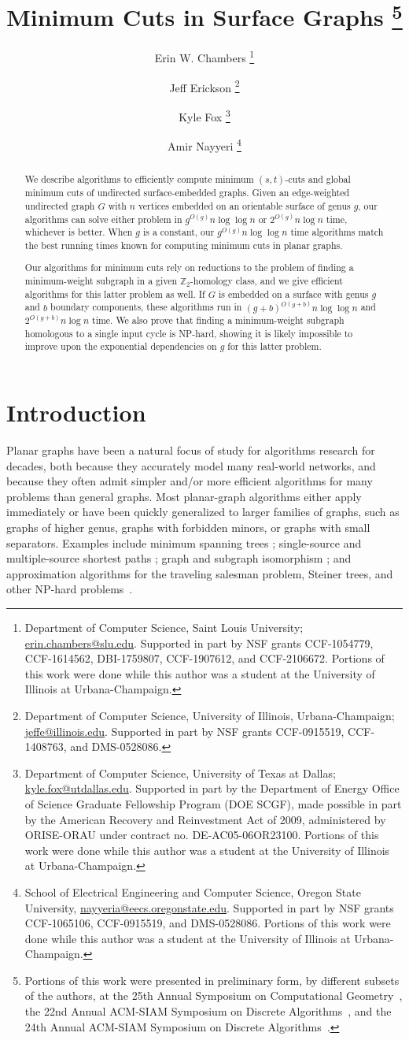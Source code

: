 \documentclass[letterpaper,review]{siamart190516}
\title{Minimum Cuts in Surface Graphs%
\thanks{
Portions of this work were presented in preliminary form, by different subsets of the authors, at
the 25th Annual Symposium on Computational Geometry~\cite{cen-mcshc-09}, the 22nd Annual ACM-SIAM
Symposium on Discrete Algorithms~\cite{en-mcsnc-11}, and the 24th Annual ACM-SIAM Symposium on Discrete Algorithms~\cite{efn-gmcse-12}.
}}
\author{
Erin W. Chambers%
	\thanks{Department of Computer Science,
	Saint Louis University;
	\url{erin.chambers@slu.edu}.
	Supported in part by NSF grants CCF-1054779, CCF-1614562, DBI-1759807, CCF-1907612, and CCF-2106672.
	Portions of this work were done while this author was a student at the University of Illinois at Urbana-Champaign.}
%
\and
Jeff Erickson%
	\thanks{Department of Computer Science,
	University of Illinois, Urbana-Champaign;
	\url{jeffe@illinois.edu}.
	Supported in part by NSF grants CCF-0915519, CCF-1408763, and DMS-0528086.
  }
%
\and
Kyle Fox%
	\thanks{Department of Computer Science,
	University of Texas at Dallas;
	\url{kyle.fox@utdallas.edu}.
	Supported in part by the Department of Energy Office of Science Graduate Fellowship Program (DOE SCGF), made possible in part by the American Recovery and Reinvestment Act of 2009, administered by ORISE-ORAU under contract no. DE-AC05-06OR23100.
	Portions of this work were done while this author was a student at the University of Illinois at Urbana-Champaign.}
%
\and
Amir Nayyeri%
	\thanks{School of Electrical Engineering and Computer Science,
	Oregon State University,
	\url{nayyeria@eecs.oregonstate.edu}.
	Supported in part by NSF grants CCF-1065106, CCF-0915519, and DMS-0528086.
	Portions of this work were done while this author was a student at the University of Illinois at Urbana-Champaign.}
}
\def\Z{\mathbb{Z}}
\begin{document}
\maketitle
\begin{abstract}
We describe algorithms to efficiently compute minimum $(s,t)$-cuts and global minimum cuts of
undirected surface-embedded graphs.
Given an edge-weighted undirected graph $G$ with $n$ vertices embedded on an orientable surface of
genus $g$, our algorithms can solve either problem in $g^{O(g)} n \log \log n$ or $2^{O(g)} n \log
n$ time, whichever is better.
When $g$ is a constant, our $g^{O(g)} n \log \log n$ time algorithms match the best running times
known for computing minimum cuts in planar graphs.

Our algorithms for minimum cuts rely on reductions to the problem of finding a minimum-weight
subgraph in a given \(\Z_2\)-homology class, and we give efficient algorithms for this latter
problem as well.
If $G$ is embedded on a surface with genus $g$ and $b$ boundary components, these algorithms run in $(g + b)^{O(g
+ b)} n \log \log n$ and $2^{O(g + b)} n \log n$ time.
We also prove that finding a minimum-weight subgraph homologous to a single input cycle is NP-hard,
showing it is likely impossible to improve upon the exponential dependencies on $g$ for this latter
problem.
\end{abstract}

\section{Introduction}
\label{sec:intro}


Planar graphs have been a natural focus of study for algorithms research for decades, both because
they accurately model many real-world networks, and because they often admit simpler and/or more
efficient algorithms for many problems than general graphs.  Most planar-graph algorithms either
apply immediately or have been quickly generalized to larger families of graphs, such as graphs of
higher genus, graphs with forbidden minors, or graphs with small separators.  Examples include
minimum spanning trees \cite{p-omst-99, m-tltam-04}; single-source and multiple-source shortest
paths \cite{cce-msspe-13, fr-pgnwe-06, hkrs-fspap-97, k-msspp-05, kmw-spdpg-09, lrt-gnd-79,
tm-spltm-09, efl-hmcpf-18}; graph and subgraph isomorphism \cite{g-itegd-00, hw-ltaip-74,
m-itgbg-80, e-sipgr-99, e-dtmcg-00}; and approximation algorithms for the traveling salesman
problem, Steiner trees, and other NP-hard problems~\cite{bdt-passp-14, bkk-ptass-07, bkk-stpg-07,
dhm-aacd-07, e-dtmcg-00, blw-mghls-17, gs-lsatw-02}.
\end{document}
